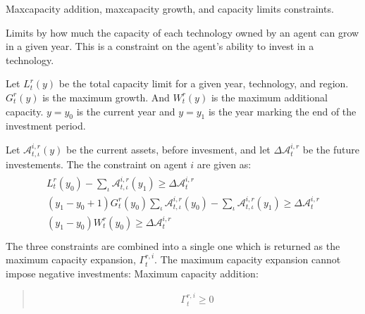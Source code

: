 \documentclass[letterpaper,10pt,english]{sphinxmanual}
\begin{document}
\begin{fulllineitems}
\label{\detokenize{api:muse.constraints.max_capacity_expansion}}
Max\sphinxhyphen{}capacity addition, max\sphinxhyphen{}capacity growth, and capacity limits constraints.

Limits by how much the capacity of each technology owned by an agent can grow in
a given year. This is a constraint on the agent’s ability to invest in a
technology.

Let \(L_t^r(y)\) be the total capacity limit for a given year, technology,
and region. \(G_t^r(y)\) is the maximum growth. And \(W_t^r(y)\) is
the maximum additional capacity. \(y=y_0\) is the current year and
\(y=y_1\) is the year marking the end of the investment period.

Let \(\mathcal{A}^{i, r}_{t, \iota}(y)\) be the current assets, before
invesment, and let \(\Delta\mathcal{A}^{i,r}_t\) be the future investements.
The the constraint on agent \(i\) are given as:
\begin{align*}\!\begin{aligned}
L_t^r(y_0) - \sum_\iota \mathcal{A}^{i, r}_{t, \iota}(y_1)
    \geq \Delta\mathcal{A}^{i,r}_t\\
(y_1 - y_0 + 1) G_t^r(y_0) \sum_\iota \mathcal{A}^{i, r}_{t, \iota}(y_0)
    - \sum_\iota \mathcal{A}^{i, r}_{t, \iota}(y_1)
    \geq \Delta\mathcal{A}^{i,r}_t\\
(y_1 - y_0)W_t^r(y_0) \geq  \Delta\mathcal{A}^{i,r}_t\\
\end{aligned}\end{align*}
The three constraints are combined into a single one which is returned as the
maximum capacity expansion, \(\Gamma_t^{r, i}\). The maximum capacity
expansion cannot impose negative investments:
Maximum capacity addition:
\begin{quote}
\begin{equation*}
\begin{split}\Gamma_t^{r, i} \geq 0\end{split}
\end{equation*}\end{quote}

\end{fulllineitems}
\end{document}
